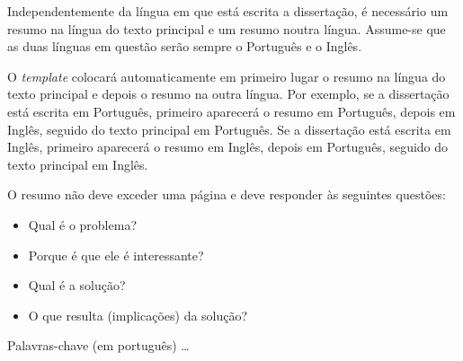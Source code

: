 Independentemente da língua em que está escrita a dissertação, é necessário um resumo na língua do texto principal e um resumo noutra língua.  Assume-se que as duas línguas em questão serão sempre o Português e o Inglês.

O \emph{template} colocará automaticamente em primeiro lugar o resumo na língua do texto principal e depois o resumo na outra língua.  Por exemplo, se a dissertação está escrita em Português, primeiro aparecerá o resumo em Português, depois em Inglês, seguido do texto principal em Português. Se a dissertação está escrita em Inglês, primeiro aparecerá o resumo em Inglês, depois em Português, seguido do texto principal em Inglês.

O resumo não deve exceder uma página e deve responder às seguintes questões:
\begin{itemize}
	\item Qual é o problema?
	\item Porque é que ele é interessante?
	\item Qual é a solução?
	\item O que resulta (implicações) da solução?
\end{itemize}

\begin{keywords}
Palavras-chave (em português) \ldots
\end{keywords}
